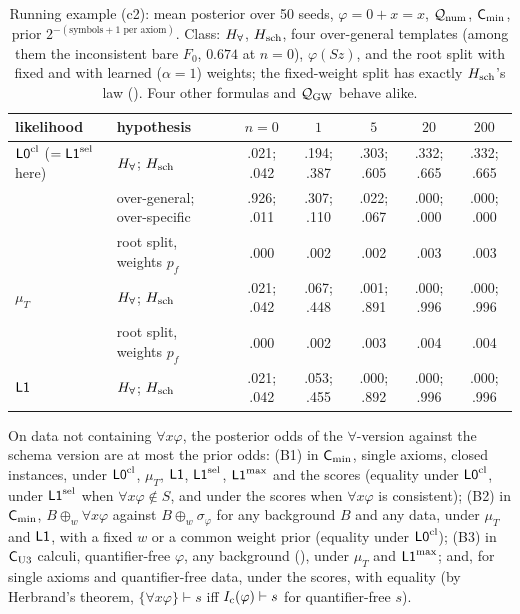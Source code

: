 \begin{table}[t]
\centering\footnotesize
\setlength{\tabcolsep}{4pt}
\begin{tabular}{@{}llccccc@{}}
\toprule
likelihood & hypothesis & $n=0$ & $1$ & $5$ & $20$ & $200$\\
\midrule
$\mathord{\mathsf{L0}}^{\mathrm{cl}}$ ($=\mathord{\mathsf{L1}}^{\mathrm{sel}}$ here) & $H_{\forall}$; $H_{\mathrm{sch}}$ & .021; .042 & .194; .387 & .303; .605 & .332; .665 & .332; .665\\
 & over-general; over-specific & .926; .011 & .307; .110 & .022; .067 & .000; .000 & .000; .000\\
 & root split, weights $p_f$ & .000 & .002 & .002 & .003 & .003\\
$\mu_T$ & $H_{\forall}$; $H_{\mathrm{sch}}$ & .021; .042 & .067; .448 & .001; .891 & .000; .996 & .000; .996\\
 & root split, weights $p_f$ & .000 & .002 & .003 & .004 & .004\\
$\mathord{\mathsf{L1}}$ & $H_{\forall}$; $H_{\mathrm{sch}}$ & .021; .042 & .053; .455 & .000; .892 & .000; .996 & .000; .996\\
\bottomrule
\end{tabular}
\caption{Running example (c2): mean posterior over 50 seeds, $\varphi=0+x=x$, $\mathcal{Q}_{\mathrm{num}}$, $\mathsf{C}_{\min}$, prior $2^{-(\text{symbols}+1\text{ per axiom})}$. Class: $H_{\forall}$, $H_{\mathrm{sch}}$, four over-general templates (among them the inconsistent bare $F_0$, $0.674$ at $n=0$), $\varphi(Sz)$, and the root split with fixed and with learned ($\alpha=1$) weights; the fixed-weight split has exactly $H_{\mathrm{sch}}$'s law (). Four other formulas and $\mathcal{Q}_{\mathrm{GW}}$ behave alike.}
\label{tab:univ:c2}
\end{table}

\begin{theorem}\label{thm:univ:B}
On data not containing $\forall x\varphi$, the posterior odds of the $\forall$-version against the schema version are at most the prior odds: \textup{(B1)} in $\mathsf{C}_{\min}$, single axioms, closed instances, under $\mathord{\mathsf{L0}}^{\mathrm{cl}}$, $\mu_T$, $\mathord{\mathsf{L1}}$, $\mathord{\mathsf{L1}}^{\mathrm{sel}}$, $\mathord{\mathsf{L1}}^{\max}$ and the scores (equality under $\mathord{\mathsf{L0}}^{\mathrm{cl}}$, under $\mathord{\mathsf{L1}}^{\mathrm{sel}}$ when $\forall x\varphi\notin S$, and under the scores when $\forall x\varphi$ is consistent); \textup{(B2)} in $\mathsf{C}_{\min}$, $B\oplus_w\forall x\varphi$ against $B\oplus_w\sigma_\varphi$ for any background $B$ and any data, under $\mu_T$ and $\mathord{\mathsf{L1}}$, with a fixed $w$ or a common weight prior (equality under $\mathord{\mathsf{L0}}^{\mathrm{cl}}$); \textup{(B3)} in $\mathsf{C}_{\mathrm{U3}}$ calculi, quantifier-free $\varphi$, any background (), under $\mu_T$ and $\mathord{\mathsf{L1}}^{\max}$; and, for single axioms and quantifier-free data, under the scores, with equality (by Herbrand's theorem, $\{\forall x\varphi\}\vdash s$ iff $I_{\mathrm{c}}(\varphi)\vdash s$ for quantifier-free $s$).
\end{theorem}

